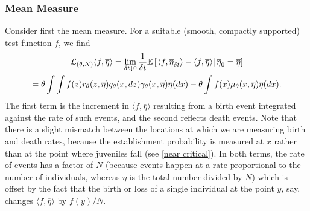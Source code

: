 \documentclass[12pt]{article}
\begin{document}
\subsubsection*{Mean Measure}

Consider first the mean measure. For a suitable 
(smooth, compactly supported) test function $f$, we find
\begin{multline} \label{mean measure}
    {\cal L}_{(\theta, N)}\langle f, \overline{\eta} \rangle
    =
    \lim_{\delta t\downarrow 0}\frac{1}{\delta t}
        \mathbb{E}\left[\left.
            \langle f,\overline{\eta}_{\delta t}\rangle -
            \langle f, \overline{\eta}\rangle
            \right| \overline{\eta}_0=\overline{\eta}
        \right]\\
    =
    \theta\int\int
            f(z) r_\theta(z,\overline{\eta}) q_\theta(x,dz)
        \gamma_\theta(x,\overline{\eta})
    \overline{\eta}(dx)
    -
    \theta\int
        f(x)\mu_\theta(x,\overline{\eta})
    \overline{\eta}(dx).
\end{multline}
The first term is the increment in $\langle f,\overline{\eta}\rangle$
resulting from a birth event
integrated against the rate of such events,
and the second reflects death events.
Note that there is a slight mismatch between the locations at which we are 
measuring birth and death rates, because
the establishment probability is measured at $x$
rather than at the point where juveniles fall (see \eqref{near critical}).
In both terms,
the rate of events has a factor of $N$
(because events happen at a rate proportional to the number of individuals,
whereas $\overline{\eta}$ is the total number divided by $N$)
which is offset by the fact that  
the birth or loss of a single 
individual at the point $y$, say, changes $\langle f,\overline{\eta}\rangle$
by $f(y)/N$.
\end{document}
